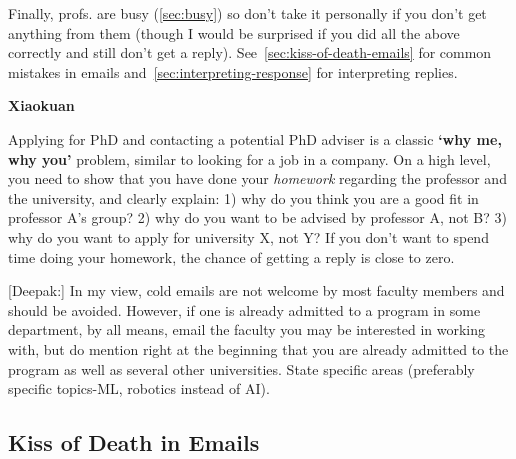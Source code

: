 \documentclass[oneside,11pt]{book}
\newenvironment{commentbox}[1][]{
  \small
  \begin{marker}[\faChessPawn{}]
    {\textbf{#1}}
  }{
  \end{marker}
}
\begin{document}
Finally, profs. are busy (\autoref{sec:busy}) so don't take it personally if you don't get anything from them (though I would be surprised if you did all the above correctly and still don't get a reply).
See~\autoref{sec:kiss-of-death-emails} for common mistakes in emails and~\autoref{sec:interpreting-response} for interpreting replies.

\begin{commentbox}[Xiaokuan]
  Applying for PhD and contacting a potential PhD adviser is a classic \textbf{`why me, why you'} problem,
  similar to looking for a job in a company.
  On a high level,
  you need to show that you have done your \emph{homework}
  regarding the professor and the university,
  and clearly explain:
  1) why do you think you are a good fit in professor A's group?
  2) why do you want to be advised by professor A, not B?
  3) why do you want to apply for university X, not Y?
  If you don't want to spend time doing your homework,
  the chance of getting a reply is close to zero.
\end{commentbox}


\begin{commentbox}
  [Deepak:]
  In my view, cold emails are not welcome by most faculty members and should be avoided. However, if one is already admitted to a program in some department, by all means, email the faculty you may be interested in working with, but do mention right at the beginning that you are already admitted to the program as well as several other universities. State specific areas (preferably specific topics-ML, robotics instead of AI).
\end{commentbox}



\subsection{Kiss of Death in Emails}\label{sec:kiss-of-death-emails}
\end{document}
